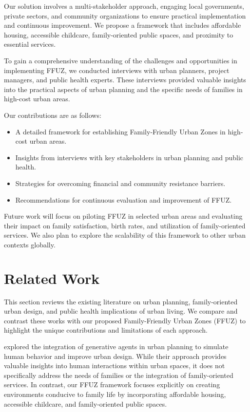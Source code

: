 \documentclass{article} %
\begin{document}
Our solution involves a multi-stakeholder approach, engaging local governments, private sectors, and community organizations to ensure practical implementation and continuous improvement. We propose a framework that includes affordable housing, accessible childcare, family-oriented public spaces, and proximity to essential services.

To gain a comprehensive understanding of the challenges and opportunities in implementing FFUZ, we conducted interviews with urban planners, project managers, and public health experts. These interviews provided valuable insights into the practical aspects of urban planning and the specific needs of families in high-cost urban areas.

Our contributions are as follows:
\begin{itemize}
    \item A detailed framework for establishing Family-Friendly Urban Zones in high-cost urban areas.
    \item Insights from interviews with key stakeholders in urban planning and public health.
    \item Strategies for overcoming financial and community resistance barriers.
    \item Recommendations for continuous evaluation and improvement of FFUZ.
\end{itemize}

Future work will focus on piloting FFUZ in selected urban areas and evaluating their impact on family satisfaction, birth rates, and utilization of family-oriented services. We also plan to explore the scalability of this framework to other urban contexts globally.

\section{Related Work}
\label{sec:related}
This section reviews the existing literature on urban planning, family-oriented urban design, and public health implications of urban living. We compare and contrast these works with our proposed Family-Friendly Urban Zones (FFUZ) to highlight the unique contributions and limitations of each approach.

\citet{park2023generative} explored the integration of generative agents in urban planning to simulate human behavior and improve urban design. While their approach provides valuable insights into human interactions within urban spaces, it does not specifically address the needs of families or the integration of family-oriented services. In contrast, our FFUZ framework focuses explicitly on creating environments conducive to family life by incorporating affordable housing, accessible childcare, and family-oriented public spaces.
\end{document}
